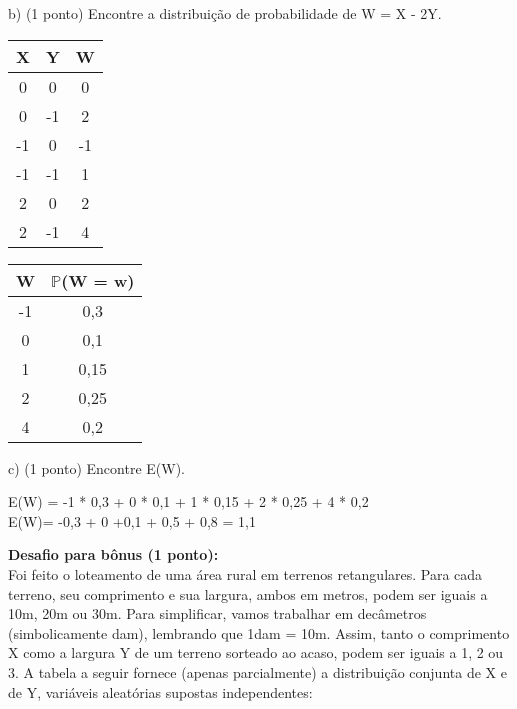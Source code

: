 \documentclass[12pt,a4paper]{article}
\begin{document}
	\vspace{1cm}
	b) (1 ponto) Encontre a distribuição de probabilidade de W = X - 2Y.\\
	\vspace{0.5cm}
	\begin{center}
		\begin{tabular}{ccc}
			X & Y & W\\ \midrule
			0 & 0 & 0\\ \midrule
			0 & -1 & 2\\ \midrule
			-1 & 0 & -1\\ \midrule
			-1 & -1 & 1\\ \midrule
			2 & 0 & 2\\ \midrule
			2 & -1 & 4\\ \midrule
		\end{tabular}
		\hspace{1cm}
		\begin{tabular}{cc}
			W & $\mathbb{P}$(W = w)\\ \midrule
			-1 & 0,3\\ \midrule
			0 & 0,1\\ \midrule
			1 & 0,15\\ \midrule
			2 & 0,25\\ \midrule
			4 & 0,2\\ \midrule
		\end{tabular}
	\end{center}
	\vspace{1cm}
	c) (1 ponto) Encontre E(W).
	\vspace{0.5cm}
	\begin{center}
		E(W) = -1 * 0,3 + 0 * 0,1 + 1 * 0,15 + 2 * 0,25 + 4 * 0,2\\
		E(W)= -0,3 + 0 +0,1 + 0,5 + 0,8 = 1,1
	\end{center}
	\vspace{1cm}
	\textbf{Desafio para bônus (1 ponto):}
	\vspace{0.25cm}\\
	Foi feito o loteamento de uma área rural em terrenos retangulares. Para cada terreno, seu comprimento e sua largura, ambos em metros, podem ser iguais a 10m, 20m ou 30m. Para simplificar, vamos trabalhar em decâmetros (simbolicamente dam), lembrando que 1dam = 10m. Assim, tanto o comprimento X como a largura Y de um terreno sorteado ao acaso, podem ser iguais a 1, 2 ou 3. A tabela a seguir fornece (apenas parcialmente) a distribuição conjunta de X e de Y, variáveis aleatórias supostas independentes:\\
\end{document}

